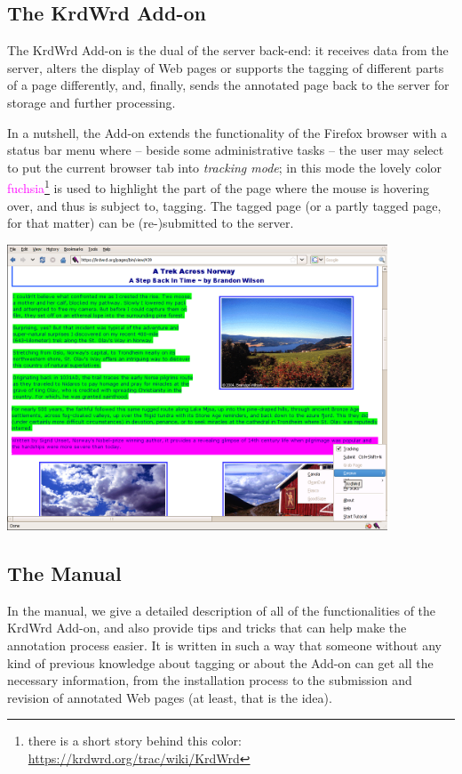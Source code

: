 \documentclass[12pt]{article}
\begin{document}
\subsection{The KrdWrd Add-on\footnotemark}

The KrdWrd Add-on is the dual of the server back-end: 
it receives data from the server, alters the display of Web pages or supports the tagging of different parts of a page differently, and, finally, sends the annotated page back to the server for storage and further processing.

In a nutshell, the Add-on extends the functionality of the Firefox browser with a status bar menu where -- beside some administrative tasks -- the user may select to put the current browser tab into \textit{tracking mode}; 
in this mode the lovely color \textcolor{fuchsia}{fuchsia}\footnote{there is a short story behind this color: \url{https://krdwrd.org/trac/wiki/KrdWrd}}  is used to highlight the part of the page where the mouse is hovering over, and thus is subject to, tagging. 
The tagged page (or a partly tagged page, for that matter) can be (re-)submitted to the server.

\begin{center}
\includegraphics[width=0.85\textwidth]{images/taggingaction.png}  
\end{center}

\addtocounter{footnote}{1}
\subsection{The Manual\footnotemark[\value{footnote}]}

In the manual, we give a detailed description of all of the functionalities of the KrdWrd Add-on, and also provide tips and tricks that can help make the annotation process easier. 
It is written in such a way that someone without any kind of previous knowledge about tagging or about the Add-on can get all the necessary information, from the installation process to the submission and revision of annotated Web pages (at least, that is the idea).
\end{document}
